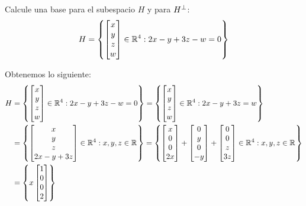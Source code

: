 \begin{exercise}
	Calcule una base para el subespacio $H$ y para $\mperp{H}$:
	\[ 
		H = 
		\set{
			\begin{bmatrix}
				x\\
				y\\
				z\\
				w
			\end{bmatrix}
			\in\rmath[4]: 2x - y + 3z - w = 0
		}
	\]
\end{exercise}
\begin{solution}
	Obtenemos lo siguiente:
	\begin{align*}
		H &=\set{
		\begin{bmatrix}
			x \\ y \\ z \\ w
		\end{bmatrix}
		\in\rmath[4]: 2x - y + 3z - w = 0
		}=\set{
		\begin{bmatrix}
			x \\ y \\ z \\ w
		\end{bmatrix}
		\in\rmath[4]: 2x - y + 3z = w
		}\\
		&=\set{
		\begin{bmatrix}
			x \\ y \\ z \\ 2x - y + 3z
		\end{bmatrix}
		\in\rmath[4]: x, y, z\in\rmath
		}=\set{
		\begin{bmatrix}
			x \\ 0 \\ 0 \\ 2x
		\end{bmatrix}
		+
		\begin{bmatrix}
			0 \\ y \\ 0 \\ - y
		\end{bmatrix}
		+
		\begin{bmatrix}
			0 \\ 0 \\ z \\ 3z
		\end{bmatrix}
		\in\rmath[4]: x, y, z\in\rmath
		}\\
		&=\set{
		x
		\begin{bmatrix}
			1 \\ 0 \\ 0 \\ 2

\end{bmatrix}}
\end{align*}
\end{solution}
